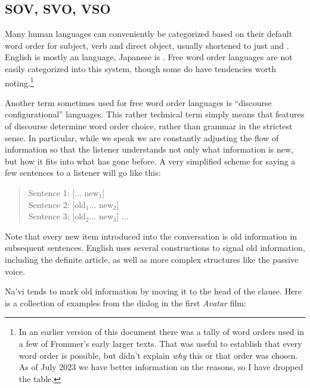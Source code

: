 \subsection{SOV, SVO, VSO} Many human languages can conveniently be
categorized based on their default word order for subject, verb and
direct object, usually shortened to just  and .  English
is mostly an  language, Japanese is .  Free word order
languages are not easily categorized into this system, though some do
have tendencies worth noting.\footnote{In an earlier version of this
document there was a tally of word orders used in a few of Frommer's
early larger texts.  That was useful to establish that every word
order is possible, but didn't explain \textit{why} this or that order
was chosen.  As of July 2023 we have better information on the
reasons, so I have dropped the table.}

Another term sometimes used for free word order languages is
``discourse configurational'' languages.  This rather technical term
simply means that features of discourse determine word order choice,
rather than grammar in the strictest sense.  In particular, while we
speak we are constantly adjusting the flow of information so that the
listener understands not only what information is new, but how it fits
into what has gone before.  A very simplified scheme for saying a few
sentences to a listener will go like this:

\begin{quotation}
\noindent Sentence 1: [... new$_1$]\\
Sentence 2: [old$_1$... new$_2$]\\
Sentence 3: [old$_2$... new$_3$] ...
\end{quotation}

\noindent Note that every new item introduced into the conversation
is old information in subsequent sentences.  English uses several
constructions to signal old information, including the definite
article,  as well as more complex structures like the passive
voice.

Na'vi tends to mark old information by moving it to the head of the
clause.  Here is a collection of examples from the dialog in the
first \textit{Avatar} film:

